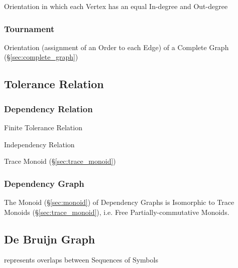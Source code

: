 Orientation in which each Vertex has an equal In-degree and Out-degree



\subsubsection{Tournament}\label{sec:tournament}

Orientation (assignment of an Order to each Edge) of a Complete Graph
(\S\ref{sec:complete_graph})



\subsection{Tolerance Relation}\label{sec:tolerance_relation}


\subsubsection{Dependency Relation}\label{sec:dependency_relation}

Finite Tolerance Relation

Independency Relation

Trace Monoid (\S\ref{sec:trace_monoid})



\subsubsection{Dependency Graph}\label{sec:dependency_graph}

The Monoid (\S\ref{sec:monoid}) of Dependency Graphs is Isomorphic to
Trace Monoids (\S\ref{sec:trace_monoid}), i.e. Free
Partially-commutative Monoids.



\subsection{De Bruijn Graph}\label{sec:debruijn_graph}

represents overlaps between Sequences of Symbols

